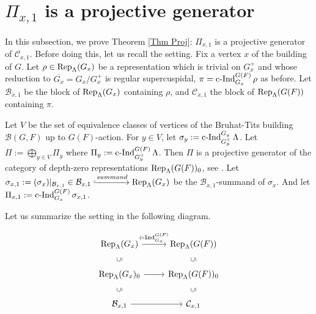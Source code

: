 		
		
		
		\section{$\Pi_{x,1}$ is a projective generator}\label{Section projective generator}
		
		In this subsection, we prove Theorem \ref{Thm Proj}: $\Pi_{x,1}$ is a projective generator of $\mathcal{C}_{x,1}$. Before doing this, let us recall the setting. Fix a vertex $x$ of the building of $G$. Let $\rho \in \operatorname{\operatorname{Rep}}_{\Lambda}(G_x)$ be a representation which is trivial on $G_x^+$ and whose reduction to $\overline{G_x}=G_x/G_x^+$ is regular supercuspidal, $\pi=\operatorname{\operatorname{c-Ind}}_{G_x}^{G(F)}\rho$ as before. Let $\mathcal{B}_{x,1}$ be the block of $\operatorname{\operatorname{Rep}}_{\Lambda}(G_x)$ containing $\rho$, and $\mathcal{C}_{x,1}$ the block of $\operatorname{\operatorname{Rep}}_{\Lambda}(G(F))$ containing $\pi$. 
		
		Let $V$ be the set of equivalence classes of vertices of the Bruhat-Tits building $\mathcal{B}(G, F)$ up to $G(F)$-action. For $y \in V$, let $\sigma_y:=\operatorname{\operatorname{c-Ind}}_{G_y^+}^{G_y}\Lambda$. Let $\Pi:=\bigoplus_{y \in V}\Pi_y$ where $\Pi_y:=\operatorname{\operatorname{c-Ind}}_{G_y^+}^{G(F)}\Lambda$. Then $\Pi$ is a projective generator of the category of depth-zero representations $\operatorname{\operatorname{Rep}}_{\Lambda}(G(F))_0$, see \cite[Appendix]{dat2009finitude}. Let $\sigma_{x,1}:=(\sigma_x)|_{\mathcal{B}_{x,1}} \in \mathcal{B}_{x,1} \xhookrightarrow{summand} \operatorname{\operatorname{Rep}}_{\Lambda}(G_x)$ be the $\mathcal{B}_{x,1}$-summand of $\sigma_x$. And let $\Pi_{x,1}:=\operatorname{\operatorname{c-Ind}}_{G_x}^{G(F)}\sigma_{x,1}$.
		
		Let us summarize the setting in the following diagram.
		
		\[\begin{tikzcd}
			{\Rep_{\Lambda}(G_x)} & {\Rep_{\Lambda}(G(F))} \\
			{\Rep_{\Lambda}(G_x)_0} & {\Rep_{\Lambda}(G(F))_0} \\
			{\mathcal{B}_{x,1}} & {\mathcal{C}_{x,1}} \\
			\arrow[from=2-1, to=2-2]
			\arrow["{\cInd_{G_x}^{G(F)}}", from=1-1, to=1-2]
			\arrow["\subseteq"{description}, sloped, draw=none, from=2-1, to=1-1]
			\arrow["\subseteq"{description}, sloped, draw=none, from=3-1, to=2-1]
			\arrow["\subseteq"{description}, sloped, draw=none, from=3-2, to=2-2]
			\arrow["\subseteq"{description}, sloped, draw=none, from=2-2, to=1-2]
			\arrow[from=3-1, to=3-2]
		\end{tikzcd}\]
		
